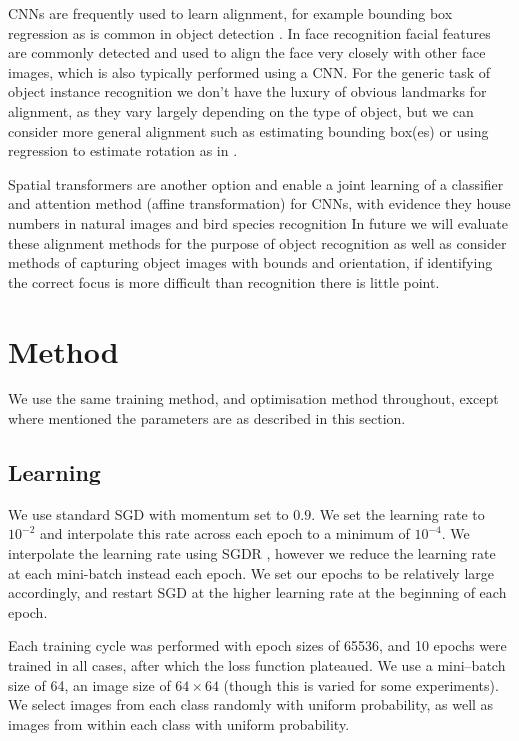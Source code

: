\gls{CNN}s are frequently used to learn alignment, for example bounding box regression as is common in object detection \cite{Sermanet2013}. In face recognition facial features are commonly detected and used to align the face very closely with other face images, which is also typically performed using a CNN. For the generic task of object instance recognition we don't have the luxury of obvious landmarks for alignment, as they vary largely depending on the type of object, but we can consider more general alignment such as estimating bounding box(es) or using regression to estimate rotation as in \cite {Fischer2015}. 

Spatial transformers \cite{Jaderberg2015} are another option and enable a joint learning of a classifier and attention method (affine transformation) for \gls{CNN}s, with evidence they  house numbers in natural images \cite{Netzer2011} and bird species recognition \cite{Wah2011} In future we will evaluate these alignment methods for the purpose of object recognition as well as consider methods of capturing object images with bounds and orientation, if identifying the correct focus is more difficult than recognition there is little point.


\section{Method}

We use the same training method, and optimisation method throughout, except where mentioned the parameters are as described in this section. 

\subsection {Learning}

We use standard \gls{SGD} with momentum set to $ 0.9 $. We set the learning rate to $ 10^{-2} $ and interpolate this rate across each epoch to a minimum of $ 10^{-4} $. We interpolate the learning rate using \gls{SGDR}  \cite{Loshchilov2016}, however we reduce the learning rate at each mini-batch instead each epoch. We set our epochs to be relatively large accordingly, and restart SGD at the higher learning rate at the beginning of each epoch. 

Each training cycle was performed with epoch sizes of 65536, and 10 epochs were trained in all cases, after which the loss function plateaued. We use a mini--batch size of 64, an image size of $64\times64$ (though this is varied for some experiments). We select images from each class randomly with uniform probability, as well as images from within each class with uniform probability.


